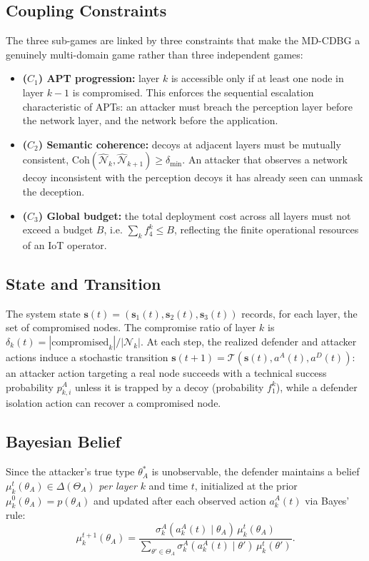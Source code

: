\documentclass[conference]{IEEEtran}
\newcommand{\Coh}{\mathrm{Coh}}
\begin{document}
\subsection{Coupling Constraints}

The three sub-games are linked by three constraints that make the MD-CDBG a
genuinely multi-domain game rather than three independent games:
\begin{itemize}
\item \textbf{($C_1$) APT progression:} layer $k$ is accessible only if at
least one node in layer $k-1$ is compromised. This enforces the sequential
escalation characteristic of APTs: an attacker must breach the perception layer
before the network layer, and the network before the application.
\item \textbf{($C_2$) Semantic coherence:} decoys at adjacent layers must be
mutually consistent, $\Coh(\hat{\mathcal{N}}_k,\hat{\mathcal{N}}_{k+1}) \geq
\delta_{\min}$. An attacker that observes a network decoy inconsistent with the
perception decoys it has already seen can unmask the deception.
\item \textbf{($C_3$) Global budget:} the total deployment cost across all
layers must not exceed a budget $B$, i.e. $\sum_k f_4^k \leq B$, reflecting the
finite operational resources of an IoT operator.
\end{itemize}

\subsection{State and Transition}

The system state $\mathbf{s}(t) = (\mathbf{s}_1(t), \mathbf{s}_2(t),
\mathbf{s}_3(t))$ records, for each layer, the set of compromised nodes. The
compromise ratio of layer $k$ is $\delta_k(t) = |\text{compromised}_k| /
|\mathcal{N}_k|$. At each step, the realized defender and attacker actions
induce a stochastic transition $\mathbf{s}(t{+}1) =
\mathcal{T}(\mathbf{s}(t), a^A(t), a^D(t))$: an attacker action targeting a real
node succeeds with a technical success probability $p_{k,i}^A$ unless it is
trapped by a decoy (probability $f_1^k$), while a defender isolation action can
recover a compromised node.

\subsection{Bayesian Belief}

Since the attacker's true type $\theta_A^*$ is unobservable, the defender
maintains a belief $\mu_k^t(\theta_A) \in \Delta(\Theta_A)$ \emph{per layer}
$k$ and time $t$, initialized at the prior $\mu_k^0(\theta_A) = p(\theta_A)$ and
updated after each observed action $a_k^A(t)$ via Bayes' rule:
\begin{equation}
\mu_k^{t+1}(\theta_A) =
\frac{\sigma_k^A(a_k^A(t)\mid\theta_A)\,\mu_k^t(\theta_A)}
{\sum_{\theta'\in\Theta_A}\sigma_k^A(a_k^A(t)\mid\theta')\,\mu_k^t(\theta')}.
\label{eq:bayes}
\end{equation}
\end{document}
